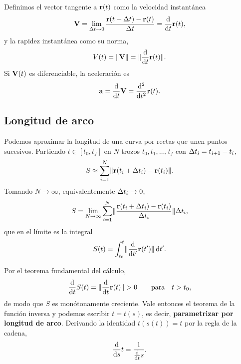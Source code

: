 Definimos el vector tangente a $\mathbf{r}(t)$ como la velocidad instant\'anea
\begin{equation}
  \label{eq:velocidad}
  \mathbf{V}=\lim_{\Delta t\rightarrow 0}
    \frac{\mathbf{r}(t+\Delta t)-\mathbf{r}(t)}{\Delta t}=\frac{\mathrm{d}}{\mathrm{d}t}\mathbf{r}(t),
\end{equation}
y la rapidez instant\'anea como su norma,
\begin{equation}
  \label{eq:rapidez}
  V(t)=\lVert \mathbf{V} \rVert=\lVert \frac{\mathrm{d}}{\mathrm{d}t}\mathbf{r}(t) \rVert .
\end{equation}
Si $\mathbf{V}(t)$ es diferenciable, la aceleraci\'on es
\begin{equation}
  \label{eq:aceleracion}
  \mathbf{a}=\frac{\mathrm{d}}{\mathrm{d}t}\mathbf{V}=\frac{\mathrm{d}^2}{\mathrm{d}t^2}\mathbf{r}(t).
\end{equation}

\subsection{Longitud de arco}
\label{subsec:longitud_arco}

Podemos aproximar la longitud de una curva por rectas que unen puntos
sucesivos. Partiendo $t\in[t_0,t_f]$ en $N$ trozos
$t_0,t_1,\dots,t_f$ con $\Delta t_i=t_{i+1}-t_i$,
\begin{equation}
  \label{eq:longitud_aproximada}
  S\approx\sum_{i=1}^{N}\lVert \mathbf{r}(t_i+\Delta t_i)-\mathbf{r}(t_i) \rVert .
\end{equation}
Tomando $N\rightarrow\infty$, equivalentemente $\Delta t_i\rightarrow 0$,
\begin{equation}
  \label{eq:longitud_limite}
  S=\lim_{N\rightarrow\infty}\sum_{i=1}^{N}
    \lVert \frac{\mathbf{r}(t_i+\Delta t_i)-\mathbf{r}(t_i)}{\Delta t_i} \rVert\Delta t_i,
\end{equation}
que en el l\'imite es la integral
\begin{equation}
  \label{eq:longitud_arco}
  S(t)=\int_{t_0}^{t}\lVert \frac{\mathrm{d}}{\mathrm{d}t'}\mathbf{r}(t') \rVert\,\mathrm{d} t' .
\end{equation}

Por el teorema fundamental del c\'alculo,
\begin{equation}
  \label{eq:derivada_arco}
  \frac{\mathrm{d}}{\mathrm{d}t}S(t)=\lVert \frac{\mathrm{d}}{\mathrm{d}t}\mathbf{r}(t) \rVert>0
  \qquad\text{para}\quad t>t_0,
\end{equation}
de modo que $S$ es mon\'otonamente creciente. Vale entonces el teorema de la
funci\'on inversa y podemos escribir $t=t(s)$, es decir,
\textbf{parametrizar por longitud de arco}. Derivando la identidad
$t(s(t))=t$ por la regla de la cadena,
\begin{equation}
  \label{eq:inversa_arco}
  \frac{\mathrm{d}}{\mathrm{d}s}t=\frac{1}{\frac{\mathrm{d}}{\mathrm{d}t}s} .
\end{equation}

